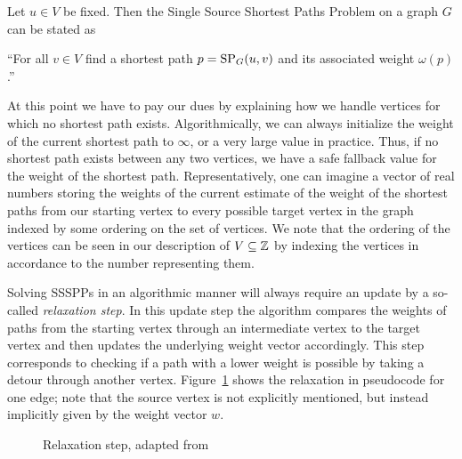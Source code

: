 \begin{definition}\label{def:ssspps}
    Let $u \in V$ be fixed. Then the Single Source Shortest Paths Problem on a graph $G$ can be stated as
    \begin{displayquote}
        ``For all $v \in V$ find a shortest path $p = \operatorname{SP}_G(u, v)$ and its associated weight $\omega(p)$.''
    \end{displayquote}
\end{definition}

At this point we have to pay our dues by explaining how we handle vertices for which no shortest path exists.
Algorithmically, we can always initialize the weight of the current shortest path to $\infty$, or a very large value in practice.
Thus, if no shortest path exists between any two vertices, we have a safe fallback value for the weight of the shortest path.
Representatively, one can imagine a vector of real numbers storing the weights of the current estimate of the weight of the shortest paths from our starting vertex to every possible target vertex in the graph indexed by some ordering on the set of vertices.
We note that the ordering of the vertices can be seen in our description of $V \subseteq \mathbb{Z}$ by indexing the vertices in accordance to the number representing them.

Solving SSSPPs in an algorithmic manner will always require an update by a so-called \emph{relaxation step}.
In this update step the algorithm compares the weights of paths from the starting vertex through an intermediate vertex to the target vertex and then updates the underlying weight vector accordingly.
This step corresponds to checking if a path with a lower weight is possible by taking a detour through another vertex.
Figure~\ref{alg:relaxation} shows the relaxation in pseudocode for one edge; note that the source vertex is not explicitly mentioned, but instead implicitly given by the weight vector $w$.

\begin{figure}[ht]
    \centering
    \begin{minipage}{.4\textwidth}
        \begin{algorithm}[H]
        \end{algorithm}
    \end{minipage}
    \caption{Relaxation step, adapted from~\cite[Chapter~24]{Cormen2001}}\label{alg:relaxation}
\end{figure}

